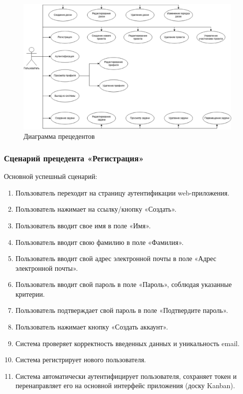 \begin{figure}[H]
	\includegraphics[width=1\linewidth]{use_case_diagram}
	\caption{Диаграмма прецедентов}
	\label{use_case_diagram:image}
\end{figure}

\subsubsection{Сценарий прецедента «Регистрация»}
Основной успешный сценарий:
\begin{enumerate}
	\item Пользователь переходит на страницу аутентификации web-приложения.
	\item Пользователь нажимает на ссылку/кнопку «Создать».
	\item Пользователь вводит свое имя в поле «Имя».
	\item Пользователь вводит свою фамилию в поле «Фамилия».
	\item Пользователь вводит свой адрес электронной почты в поле «Адрес электронной почты».
	\item Пользователь вводит свой пароль в поле «Пароль», соблюдая указанные критерии.
	\item Пользователь подтверждает свой пароль в поле «Подтвердите пароль».
	\item Пользователь нажимает кнопку «Создать аккаунт».
	\item Система проверяет корректность введенных данных и уникальность email.
	\item Система регистрирует нового пользователя.
	\item Система автоматически аутентифицирует пользователя, сохраняет токен и перенаправляет его на основной интерфейс приложения (доску Kanban).
\end{enumerate}

